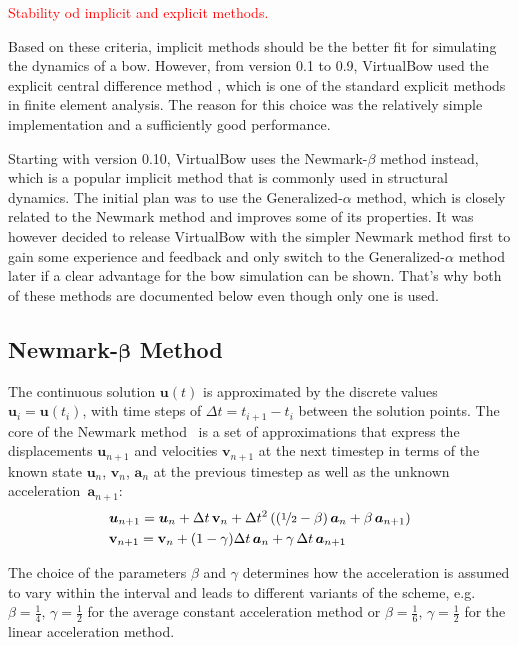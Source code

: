 \textcolor{red}{Stability od implicit and explicit methods.}

Based on these criteria, implicit methods should be the better fit for simulating the dynamics of a bow.
However, from version 0.1 to 0.9, VirtualBow used the explicit central difference method \cite{bib:bathe2006}, which is one of the standard explicit methods in finite element analysis.
The reason for this choice was the relatively simple implementation and a sufficiently good performance.

Starting with version 0.10, VirtualBow uses the Newmark-$\beta$ method instead, which is a popular implicit method that is commonly used in structural dynamics.
The initial plan was to use the Generalized-$\alpha$ method, which is closely related to the Newmark method and improves some of its properties.
It was however decided to release VirtualBow with the simpler Newmark method first to gain some experience and feedback and only switch to the Generalized-$\alpha$ method later if a clear advantage for the bow simulation can be shown.
That's why both of these methods are documented below even though only one is used.

\subsection{Newmark-$\boldsymbol{\beta}$ Method}

The continuous solution $\boldsymbol{u}(t)$ is approximated by the discrete values~$\boldsymbol{u}_i = \boldsymbol{u}(t_{i})$, with time steps of $\Delta t = t_{i+1} - t_{i}$ between the solution points.
The core of the Newmark method~\cite{bib:bathe2006} is a set of approximations that express the displacements $\boldsymbol{u}_{n+1}$ and velocities $\mathbf{v}_{n+1}$ at the next timestep in terms of the known state $\boldsymbol{u}_{n}$, $\mathbf{v}_{n}$, $\boldsymbol{a}_{n}$ at the previous timestep as well as the unknown acceleration~$\boldsymbol{a}_{n+1}$:
%
\begin{align}
&\boldsymbol{u}_{n+1} = \boldsymbol{u}_{n} + \Delta t\,\mathbf{v}_{n} + \Delta t^2 \left( \left(\nicefrac{1}{2} - \beta\right)\boldsymbol{a}_{n} + \beta\,\boldsymbol{a}_{n+1} \right) \label{eq:newmark_u} \\
&\mathbf{v}_{n+1} = \mathbf{v}_{n} + (1 - \gamma)\Delta t\,\boldsymbol{a}_{n} + \gamma\,\Delta t\,\boldsymbol{a}_{n+1} \label{eq:newmark_v}
\end{align}

The choice of the parameters $\beta$ and $\gamma$ determines how the acceleration is assumed to vary within the interval and leads to different variants of the scheme, e.g. $\beta = \frac{1}{4},\,\gamma = \frac{1}{2}$ for the average constant acceleration method or $\beta = \frac{1}{6},\,\gamma = \frac{1}{2}$ for the linear acceleration method.


